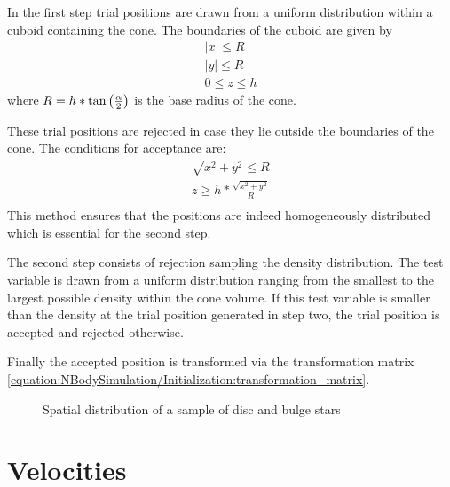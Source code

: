 \documentclass[letterpaper,10pt,english]{sphinxmanual}
\begin{document}
\sphinxAtStartPar
In the first step trial positions are drawn from a uniform distribution within a cuboid containing the cone.
The boundaries of the cuboid are given by
\begin{equation*}
\begin{split}|x|\leq R \\
|y|\leq R \\
0\leq z\leq h\end{split}
\end{equation*}
\sphinxAtStartPar
where \(R=h*\textup{tan}\left ( \frac{\alpha}{2} \right )\) is the base radius of the cone.

\sphinxAtStartPar
These trial positions are rejected in case they lie outside the boundaries of the cone.
The conditions for acceptance are:
\begin{equation*}
\begin{split}\sqrt{x^{2}+y^{2}}\leq R \\
z\geq h*\frac{\sqrt{x^{2}+y^{2}}}{R} \\\end{split}
\end{equation*}
\sphinxAtStartPar
This method ensures that the positions are indeed homogeneously distributed which is essential for the second step.

\sphinxAtStartPar
The second step consists of rejection sampling the density distribution.
The test variable is drawn from a uniform distribution ranging from the smallest to the largest possible density within the cone volume.
If this test variable is smaller than the density at the trial position generated in step two, the trial position is accepted and rejected otherwise.

\sphinxAtStartPar
Finally the accepted position is transformed via the transformation matrix \eqref{equation:NBodySimulation/Initialization:transformation_matrix}.

\begin{figure}[htbp]
\centering
\capstart

\noindent{}
\caption{Spatial distribution of a sample of disc and bulge stars}\label{\detokenize{NBodySimulation/Initialization:id45}}\label{\detokenize{NBodySimulation/Initialization:fig-initial-conditions-positions}}\end{figure}


\section{Velocities}
\label{\detokenize{NBodySimulation/Initialization:velocities}}
\end{document}
